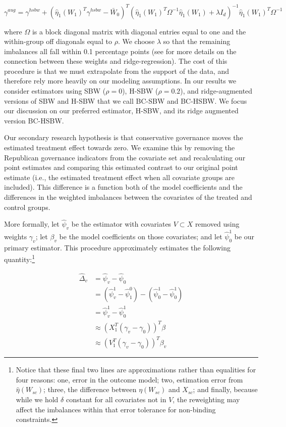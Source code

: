\documentclass{article}
\begin{document}
$$
\gamma^{aug} = \gamma^{hsbw} + (\hat{\eta}_1(W_1)^T\gamma^{hsbw} - \bar{W}_0)^T(\hat{\eta}_1(W_1)^T\Omega^{-1}\hat{\eta}_1(W_1) + \lambda I_d)^{-1}\hat{\eta}_1(W_1)^T\Omega^{-1}
$$

where $\Omega$ is a block diagonal matrix with diagonal entries equal to one and the within-group off diagonals equal to $\rho$. We choose $\lambda$ so that the remaining imbalances all fall within 0.1 percentage points (see \cite{ben2018augmented} for more details on the connection between these weights and ridge-regression). The cost of this procedure is that we must extrapolate from the support of the data, and therefore rely more heavily on our modeling assumptions. In our results we consider estimators using SBW ($\rho = 0$), H-SBW ($\rho = 0.2$), and ridge-augmented versions of SBW and H-SBW that we call BC-SBW and BC-HSBW. We focus our discussion on our preferred estimator, H-SBW, and its ridge augmented version BC-HSBW. 

Our secondary research hypothesis is that conservative governance moves the estimated treatment effect towards zero. We examine this by removing the Republican governance indicators from the covariate set and recalculating our point estimates and comparing this estimated contrast to our original point estimate (i.e., the estimated treatment effect when all covariate groups are included). This difference is a function both of the model coefficients and the differences in the weighted imbalances between the covariates of the treated and control groups.

More formally, let $\hat{\psi}_v$ be the estimator with covariates $V \subset X$ removed using weights $\gamma_v$; let $\beta_v$ be the model coefficients on those covariates; and let $\hat{\psi}^1_0$ be our primary estimator. This procedure approximately estimates the following quantity:\footnote{Notice that these final two lines are approximations rather than equalities for four reasons: one, error in the outcome model; two, estimation error from $\hat{\eta}(W_{sc})$; three, the difference between $\eta(W_{sc})$ and $X_{sc}$; and finally, because while we hold $\delta$ constant for all covariates not in $V$, the reweighting may affect the imbalances within that error tolerance for non-binding constraints.}

\begin{align*}
    \hat{\Delta}_v &= \hat{\psi}_v - \hat{\psi}_0 \\
    &= (\hat{\psi}^1_v - \hat{\psi}^0_1)  - (\hat{\psi}^1_0 - \hat{\psi}^1_0) \\
    &= \hat{\psi}^1_v - \hat{\psi}^1_0 \\
    &\approx (X_1^T(\gamma_v - \gamma_0))^T\beta \\
    &\approx (V_1^T(\gamma_v - \gamma_0))^T\beta_v
\end{align*}
\end{document}
